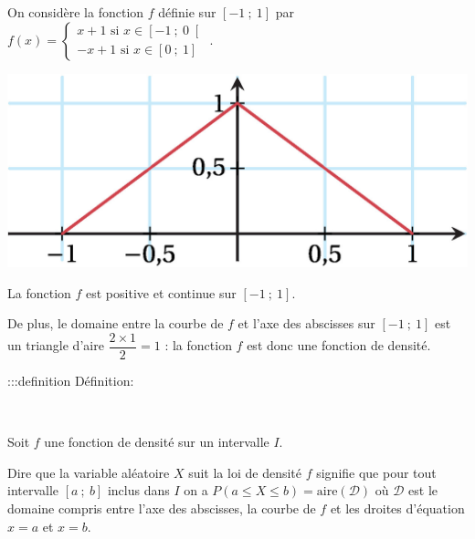 \documentclass{cornouaille}
\begin{document}
\begin{exemple}


\begin{minipage}{0.5\linewidth}
On considère la fonction $f$ définie sur $\left[-1\ ;\ 1 \right]$ par $f(x)=\left\{
\begin{array}{l}
x+1 \textrm{ si } x\in\left[-1\ ;\ 0 \right[ \\
-x+1 \textrm{ si } x\in\left[0\ ;\ 1 \right]
\end{array}
\right.$.
\end{minipage}

\hfill

\begin{minipage}{0.5\linewidth}



\includegraphics{./TS-Variables-0}



\end{minipage}


La fonction $f$ est positive et continue sur $\left[-1\ ;\ 1 \right]$.

De plus, le domaine entre la courbe de $f$ et l'axe des abscisses sur $\left[-1\ ;\ 1 \right]$ est un triangle d'aire $\dfrac{2\times1}{2}=1$ : la fonction $f$ est donc une fonction de densité.
\end{exemple}




:::definition Définition: 


~~


\begin{minipage}{0.65\linewidth}

Soit $f$ une fonction de densité sur un intervalle $I$.\medskip


Dire que la variable aléatoire $X$ suit la loi de densité $f$ signifie que pour tout intervalle $\left[a\ ;\ b \right]$ inclus dans $I$ on a ${P(a\leqslant X \leqslant b )=\textrm{aire}\left(\mathcal{D}\right)}$ où $\mathcal{D}$ est le domaine compris entre l'axe des abscisses, la courbe de $f$ et les droites d'équation $x=a$ et $x=b$.
\end{minipage}
\end{document}
